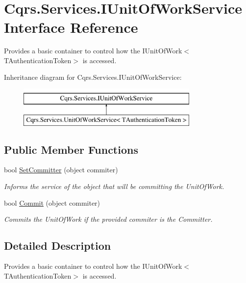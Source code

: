 \hypertarget{interfaceCqrs_1_1Services_1_1IUnitOfWorkService}{}\section{Cqrs.\+Services.\+I\+Unit\+Of\+Work\+Service Interface Reference}
\label{interfaceCqrs_1_1Services_1_1IUnitOfWorkService}


Provides a basic container to control how the I\+Unit\+Of\+Work$<$\+T\+Authentication\+Token$>$ is accessed.  


Inheritance diagram for Cqrs.\+Services.\+I\+Unit\+Of\+Work\+Service\+:\begin{figure}[H]
\begin{center}
\leavevmode
\includegraphics[height=2.000000cm]{interfaceCqrs_1_1Services_1_1IUnitOfWorkService}
\end{center}
\end{figure}
\subsection*{Public Member Functions}
\begin{DoxyCompactItemize}
\item 
bool \hyperlink{interfaceCqrs_1_1Services_1_1IUnitOfWorkService_a54f241cd90bbebf9cc73d5a296ed593b_a54f241cd90bbebf9cc73d5a296ed593b}{Set\+Committer} (object commiter)
\begin{DoxyCompactList}\small\item\em Informs the service of the object that will be committing the Unit\+Of\+Work. \end{DoxyCompactList}\item 
bool \hyperlink{interfaceCqrs_1_1Services_1_1IUnitOfWorkService_a3bd8a6a931fc6f457d136d979d26cead_a3bd8a6a931fc6f457d136d979d26cead}{Commit} (object commiter)
\begin{DoxyCompactList}\small\item\em Commits the Unit\+Of\+Work if the provided {\itshape commiter}  is the Committer. \end{DoxyCompactList}\end{DoxyCompactItemize}


\subsection{Detailed Description}
Provides a basic container to control how the I\+Unit\+Of\+Work$<$\+T\+Authentication\+Token$>$ is accessed. 



